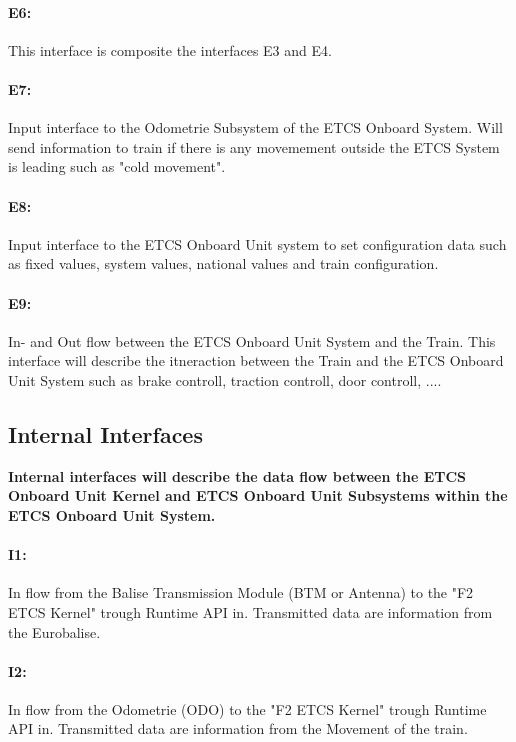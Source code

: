 \paragraph{E6:} This interface is composite the interfaces E3 and E4.

\paragraph{E7:} Input interface to the Odometrie Subsystem of the ETCS Onboard System. Will send information to train if there is any movemement outside the ETCS System is leading such as "cold movement".

\paragraph{E8:} Input interface to the ETCS Onboard Unit system to set configuration data such as fixed values, system values, national values and train configuration.

\paragraph{E9:} In- and Out flow between the ETCS Onboard Unit System and the Train. This interface will describe the itneraction between the Train and the ETCS Onboard Unit System such as brake controll, traction controll, door controll, ....

\subsection{Internal Interfaces}
\textbf{Internal interfaces will describe the data flow between the ETCS Onboard Unit Kernel and ETCS Onboard Unit Subsystems within the ETCS Onboard Unit System.}

\paragraph{I1:} In flow from the Balise Transmission Module (BTM or Antenna) to the "F2 ETCS Kernel" trough Runtime API in. Transmitted data are information from the Eurobalise.

\paragraph{I2:} In flow from the Odometrie (ODO) to the "F2 ETCS Kernel" trough Runtime API in. Transmitted data are information from the Movement of the train.


